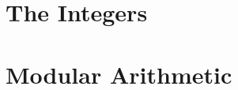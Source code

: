 \documentclass[a4paper, 12pt]{report}
\theoremstyle{definition}
\begin{document}
\chapter{The Integers}
\label{ch:intgs}



\chapter{Modular Arithmetic}
\label{ch:mod_arth}


\end{document}
